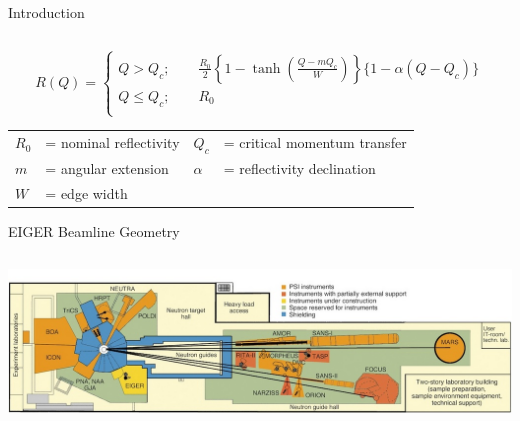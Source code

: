 \documentclass[final,t]{beamer}
\begin{document}
\begin{frame}{}
\begin{columns}[t]
\begin{column}{.3\linewidth}
\begin{block}{Introduction}
\begin{columns}
\begin{column}{.5\linewidth}
\end{column}
\end{columns}
\vspace{-4ex}
\begin{center}
\begin{equation*}\label{eq:ref}
        R(Q) = 
        \begin{cases}
            Q > Q_c;  \qquad \frac{R_0}{2}\left\{  1 - \tanh\left(  \frac{Q - m Q_c}{W}\right) \right\}\{1-\alpha(Q-Q_c)\} \\
            Q \leq Q_c; \qquad R_0 \\
        \end{cases}
    \end{equation*}

        \begin{tabular}{l l l l}
        $R_0$    & = nominal reflectivity & $ Q_c  $  & = critical momentum transfer   \\
        $m  $    & = angular extension    & $\alpha$  & = reflectivity declination  \\
        $W  $    & = edge width           &           &   
        \end{tabular}
\end{center} 
      \end{block}

      \begin{block}{EIGER Beamline Geometry}
      
        \begin{columns}[T]
          \begin{column}{.75\linewidth}
        
        \includegraphics*[width=\linewidth]{exp.jpg}


\end{column}
\end{columns}
\end{block}
\end{column}
\end{columns}
\end{frame}
\end{document}
